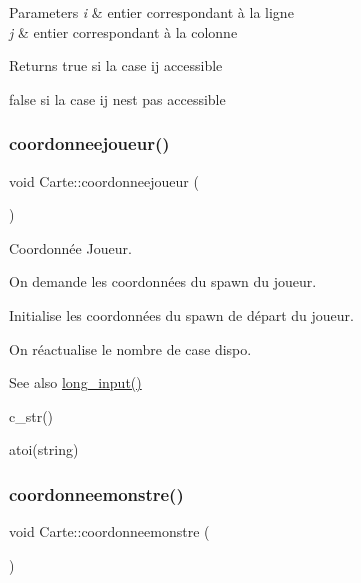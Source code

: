 \begin{DoxyParams}{Parameters}
{\em i} & entier correspondant à la ligne \\
\hline
{\em j} & entier correspondant à la colonne \\
\hline
\end{DoxyParams}
\begin{DoxyReturn}{Returns}
true si la case ij accessible 

false si la case ij n\textquotesingle{}est pas accessible 
\end{DoxyReturn}
\mbox{\label{class_carte_ae11b9253ce5aa727b6c49320f92e0668}} 
\subsubsection{\texorpdfstring{coordonneejoueur()}{coordonneejoueur()}}
{\footnotesize\ttfamily void Carte\+::coordonneejoueur (\begin{DoxyParamCaption}{ }\end{DoxyParamCaption})}



Coordonnée Joueur. 

On demande les coordonnées du spawn du joueur.

Initialise les coordonnées du spawn de départ du joueur.

On réactualise le nombre de case dispo.

\begin{DoxySeeAlso}{See also}
\hyperlink{namespaceio_ab044be3afd7ac04eeb1a496af0f1d5c6}{long\+\_\+input()} 

c\+\_\+str() 

atoi(string) 
\end{DoxySeeAlso}
\mbox{\label{class_carte_ad3f5fbdd5c6a248e92bad65680493ccd}} 
\subsubsection{\texorpdfstring{coordonneemonstre()}{coordonneemonstre()}}
{\footnotesize\ttfamily void Carte\+::coordonneemonstre (\begin{DoxyParamCaption}{ }\end{DoxyParamCaption})}



